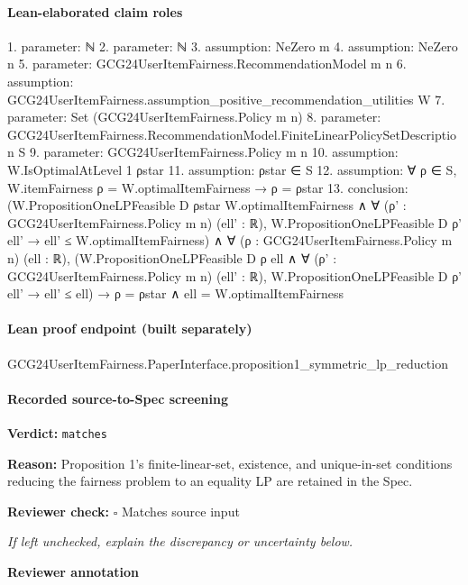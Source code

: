 \documentclass[10pt]{article}
\newcommand{\reviewerbox}{%
  \par\noindent\fbox{\parbox{0.96\linewidth}{\rule{0pt}{0.38in}}}\par
}
\newcommand{\reviewmatch}[1]{%
  \par\noindent\textbf{Reviewer check:} $\square$\; #1\par
  \noindent\emph{If left unchecked, explain the discrepancy or uncertainty below.}\par
}
\begin{document}
\paragraph{Lean-elaborated claim roles}\begin{ReviewVerbatim}
1. parameter: ℕ
2. parameter: ℕ
3. assumption: NeZero m
4. assumption: NeZero n
5. parameter: GCG24UserItemFairness.RecommendationModel m n
6. assumption: GCG24UserItemFairness.assumption_positive_recommendation_utilities W
7. parameter: Set (GCG24UserItemFairness.Policy m n)
8. parameter: GCG24UserItemFairness.RecommendationModel.FiniteLinearPolicySetDescription S
9. parameter: GCG24UserItemFairness.Policy m n
10. assumption: W.IsOptimalAtLevel 1 ρstar
11. assumption: ρstar ∈ S
12. assumption: ∀ ρ ∈ S, W.itemFairness ρ = W.optimalItemFairness → ρ = ρstar
13. conclusion: (W.PropositionOneLPFeasible D ρstar W.optimalItemFairness ∧
    ∀ (ρ' : GCG24UserItemFairness.Policy m n) (ell' : ℝ),
      W.PropositionOneLPFeasible D ρ' ell' → ell' ≤ W.optimalItemFairness) ∧
  ∀ (ρ : GCG24UserItemFairness.Policy m n) (ell : ℝ),
    (W.PropositionOneLPFeasible D ρ ell ∧
        ∀ (ρ' : GCG24UserItemFairness.Policy m n) (ell' : ℝ), W.PropositionOneLPFeasible D ρ' ell' → ell' ≤ ell) →
      ρ = ρstar ∧ ell = W.optimalItemFairness
\end{ReviewVerbatim}

\paragraph{Lean proof endpoint (built separately)}\begin{ReviewVerbatim}
GCG24UserItemFairness.PaperInterface.proposition1_symmetric_lp_reduction
\end{ReviewVerbatim}

\paragraph{Recorded source-to-Spec screening}
\textbf{Verdict:} \texttt{matches}
\\
{\raggedright
\textbf{Reason:} Proposition 1's finite-\allowbreak{}linear-\allowbreak{}set, existence, and unique-\allowbreak{}in-\allowbreak{}set conditions reducing the fairness problem to an equality LP are retained in the Spec.\allowbreak{}
\par}
\reviewmatch{Matches source input}
\noindent\textbf{Reviewer annotation}\par
\reviewerbox
\clearpage
\hypertarget{source-claim-886aec0cf4d20216}{}
\end{document}
